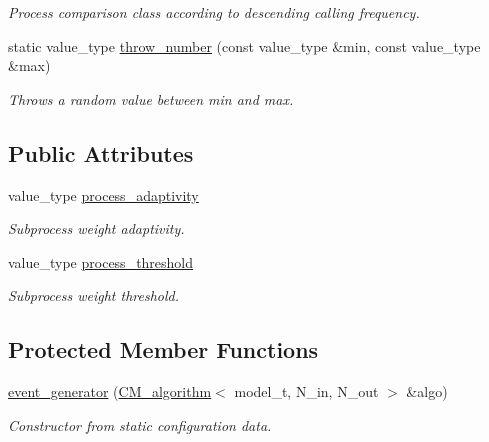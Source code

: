 \begin{DoxyCompactItemize}
\begin{DoxyCompactList}\small\item\em Process comparison class according to descending calling frequency. \end{DoxyCompactList}\item 
\hypertarget{a00212_afca81c2263716db3729afa16f40e0b0b}{}static value\+\_\+type \hyperlink{a00212_afca81c2263716db3729afa16f40e0b0b}{throw\+\_\+number} (const value\+\_\+type \&min, const value\+\_\+type \&max)\label{a00212_afca81c2263716db3729afa16f40e0b0b}

\begin{DoxyCompactList}\small\item\em Throws a random value between min and max. \end{DoxyCompactList}\end{DoxyCompactItemize}
\subsection*{Public Attributes}
\begin{DoxyCompactItemize}
\item 
\hypertarget{a00212_a2ee6a342001e0c46d2a612d05b92ac55}{}value\+\_\+type \hyperlink{a00212_a2ee6a342001e0c46d2a612d05b92ac55}{process\+\_\+adaptivity}\label{a00212_a2ee6a342001e0c46d2a612d05b92ac55}

\begin{DoxyCompactList}\small\item\em Subprocess weight adaptivity. \end{DoxyCompactList}\item 
\hypertarget{a00212_af2588f84c62c70bb8f58b7a26a03a1a3}{}value\+\_\+type \hyperlink{a00212_af2588f84c62c70bb8f58b7a26a03a1a3}{process\+\_\+threshold}\label{a00212_af2588f84c62c70bb8f58b7a26a03a1a3}

\begin{DoxyCompactList}\small\item\em Subprocess weight threshold. \end{DoxyCompactList}\end{DoxyCompactItemize}
\subsection*{Protected Member Functions}
\begin{DoxyCompactItemize}
\item 
\hypertarget{a00212_a535119cb75b01e2a00f064da31a0140d}{}\hyperlink{a00212_a535119cb75b01e2a00f064da31a0140d}{event\+\_\+generator} (\hyperlink{a00065}{C\+M\+\_\+algorithm}$<$ model\+\_\+t, N\+\_\+in, N\+\_\+out $>$ \&algo)\label{a00212_a535119cb75b01e2a00f064da31a0140d}

\begin{DoxyCompactList}\small\item\em Constructor from static configuration data. \end{DoxyCompactList}\end{DoxyCompactItemize}
